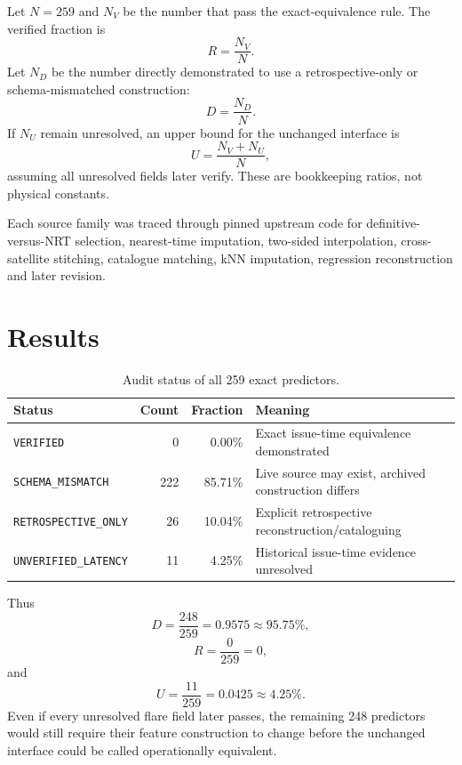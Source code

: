 \documentclass[11pt]{article}
\begin{document}
Let $N=259$ and $N_V$ be the number that pass the exact-equivalence rule. The verified fraction is
\begin{equation}R=\frac{N_V}{N}.\end{equation}
Let $N_D$ be the number directly demonstrated to use a retrospective-only or schema-mismatched construction:
\begin{equation}D=\frac{N_D}{N}.\end{equation}
If $N_U$ remain unresolved, an upper bound for the unchanged interface is
\begin{equation}U=\frac{N_V+N_U}{N},\end{equation}
assuming all unresolved fields later verify. These are bookkeeping ratios, not physical constants.

Each source family was traced through pinned upstream code for definitive-versus-NRT selection, nearest-time imputation, two-sided interpolation, cross-satellite stitching, catalogue matching, kNN imputation, regression reconstruction and later revision.

\section{Results}
\begin{table}[h]\centering
\begin{tabular}{lrrl}\toprule
Status & Count & Fraction & Meaning \\\midrule
\texttt{VERIFIED} & 0 & 0.00\% & Exact issue-time equivalence demonstrated \\
\texttt{SCHEMA\_MISMATCH} & 222 & 85.71\% & Live source may exist, archived construction differs \\
\texttt{RETROSPECTIVE\_ONLY} & 26 & 10.04\% & Explicit retrospective reconstruction/cataloguing \\
\texttt{UNVERIFIED\_LATENCY} & 11 & 4.25\% & Historical issue-time evidence unresolved \\\bottomrule
\end{tabular}\caption{Audit status of all 259 exact predictors.}\end{table}

Thus
\begin{equation}D=\frac{248}{259}=0.9575\approx95.75\%,\end{equation}
\begin{equation}R=\frac{0}{259}=0,\end{equation}
and
\begin{equation}U=\frac{11}{259}=0.0425\approx4.25\%.\end{equation}
Even if every unresolved flare field later passes, the remaining 248 predictors would still require their feature construction to change before the unchanged interface could be called operationally equivalent.
\end{document}
